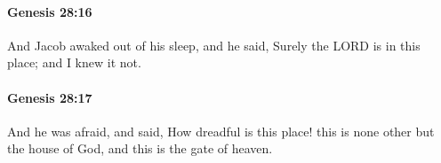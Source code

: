 		\paragraph{Genesis 28:16} %
			\label{GENESIS-28-16}

			And Jacob awaked out of his sleep, and he said, Surely the LORD is in this place; and I knew it not.


		\paragraph{Genesis 28:17} %
			\label{GENESIS-28-17}

			And he was afraid, and said, How dreadful is this place! this is none other but the house of God, and this is the gate of heaven.


